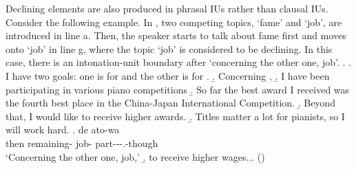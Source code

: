 Declining elements are also produced in phrasal IUs rather than clausal IUs.
Consider the following example.
In \Next,
two competing topics,  `fame' and  `job',
are introduced in line a.
Then, the speaker starts to talk about fame first and moves onto `job' in line g,
where the topic  `job' is considered to be declining.
In this case, there is an intonation-unit boundary after  `concerning the other one, job'.
%
\ex.
 \a. I have two goals: one is for  and the other is for .
 \b. Concerning ,
 \b. I have been participating in various piano competitions
 \b. So far the best award I received was the fourth best place in the China-Japan International Competition.
 \b. Beyond that, I would like to receive higher awards.
 \b. Titles matter a lot for pianists, so I will work hard.
 \bg. de {\iub} ato-wa {\iub}  {\iub}  {\iub} \\
 	then {} remaining- {} job- {} part---.-though {} \\
	`Concerning the other one, job,'
 \b. to receive higher wages...
\hfill{()}
%


%


